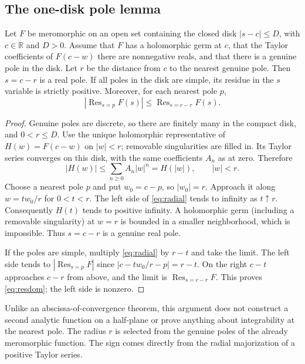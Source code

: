 \documentclass[11pt,letterpaper]{article}
\theoremstyle{remark}\newtheorem{remark}[theorem]{Remark}
\newcommand{\R}{\mathbb R}\newcommand{\C}{\mathbb C}\newcommand{\Res}{\operatorname{Res}}
\begin{document}
\subsection{The one-disk pole lemma}
\begin{lemma}\label{lem:disk}
Let $F$ be meromorphic on an open set containing the closed disk $|s-c|\le D$, with $c\in\R$ and $D>0$. Assume that $F$ has a holomorphic germ at $c$, that the Taylor coefficients of $F(c-w)$ there are nonnegative reals, and that there is a genuine pole in the disk. Let $r$ be the distance from $c$ to the nearest genuine pole. Then $s=c-r$ is a real pole. If all poles in the disk are simple, its residue in the $s$ variable is strictly positive. Moreover, for each nearest pole $p$,
\begin{equation}\label{eq:resdom}
 |\Res_{s=p} F(s)|\le \Res_{s=c-r}F(s).
\end{equation}
\end{lemma}
\begin{proof}
Genuine poles are discrete, so there are finitely many in the compact disk, and $0<r\le D$. Use the unique holomorphic representative of $H(w)=F(c-w)$ on $|w|<r$; removable singularities are filled in. Its Taylor series converges on this disk, with the same coefficients $A_n$ as at zero. Therefore
\begin{equation}\label{eq:radial}
 |H(w)|\le\sum_{n\ge0}A_n|w|^n=H(|w|),\qquad |w|<r.
\end{equation}
Choose a nearest pole $p$ and put $w_0=c-p$, so $|w_0|=r$. Approach it along $w=t w_0/r$ for $0<t<r$. The left side of \eqref{eq:radial} tends to infinity as $t\uparrow r$. Consequently $H(t)$ tends to positive infinity. A holomorphic germ (including a removable singularity) at $w=r$ is bounded in a smaller neighborhood, which is impossible. Thus $s=c-r$ is a genuine real pole.

If the poles are simple, multiply \eqref{eq:radial} by $r-t$ and take the limit. The left side tends to $|\Res_{s=p}F|$ since $|c-tw_0/r-p|=r-t$. On the right $c-t$ approaches $c-r$ from above, and the limit is $\Res_{s=c-r} F$. This proves \eqref{eq:resdom}; the left side is nonzero.
\end{proof}
Unlike an abscissa-of-convergence theorem, this argument does not construct a second analytic function on a half-plane or prove anything about integrability at the nearest pole. The radius $r$ is selected from the genuine poles of the already meromorphic function. The sign comes directly from the radial majorization of a positive Taylor series.
\end{document}

